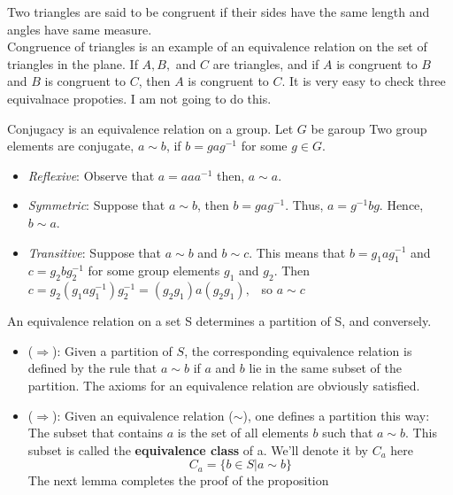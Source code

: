 \documentclass[
]{book}
\providecommand{\tightlist}{%
  \setlength{\itemsep}{0pt}\setlength{\parskip}{0pt}}
\begin{document}
\leavevmode{}%
Two triangles are said to be congruent if their sides have the same
length and angles have same measure.\\
Congruence of triangles is an example of an equivalence relation on the
set of triangles in the plane. If \(A , B,\) and \(C\) are triangles,
and if \(A\) is congruent to \(B\) and \(B\) is congruent to \(C\), then
\(A\) is congruent to \(C\). It is very easy to check three equivalnace
propoties. I am not going to do this.

\leavevmode{}%
Conjugacy is an equivalence relation on a group. Let \(G\) be garoup Two
group elements are conjugate, \(a\sim b\), if \(b = gag^{- 1}\) for some
\(g\in G\).

\begin{itemize}
\tightlist
\item
  \emph{Reflexive}: Observe that \(a=aaa^{-1}\) then, \(a\sim a\).
\item
  \emph{Symmetric}: Suppose that \(a\sim b\), then \(b=gag^{-1}\). Thus,
  \(a=g^{-1}bg\). Hence, \(b \sim a\).
\item
  \emph{Transitive}: Suppose that \(a\sim b\) and \(b \sim c\). This
  means that \(b = g_1ag_1^{-1}\) and \(c = g_2bg_2^{-1}\) for some
  group elements \(g_1\) and \(g_2\). Then
  \(c = g_2(g_1ag_1^{-1})g_2^{-1} = (g_2 g_1)a (g_2 g_1),\) ~so
  \(a \sim c\)
\end{itemize}

\leavevmode{}%
An equivalence relation on a set S determines a partition of S, and
conversely.

\begin{itemize}
\tightlist
\item
  (\(\Longrightarrow\)): Given a partition of \(S\), the corresponding
  equivalence relation is defined by the rule that \(a \sim b\) if \(a\)
  and \(b\) lie in the same subset of the partition. The axioms for an
  equivalence relation are obviously satisfied.
\item
  (\(\Longrightarrow\)): Given an equivalence relation (\(\sim\)), one
  defines a partition this way:\\
  The subset that contains \(a\) is the set of all elements \(b\) such
  that \(a \sim b\). This subset is called the \textbf{equivalence
  class} of a. We'll denote it by \(C_a\) here
  \[C_a = \{b \in S | a\sim b\}\] The next lemma completes the proof of
  the proposition
\end{itemize}
\end{document}
